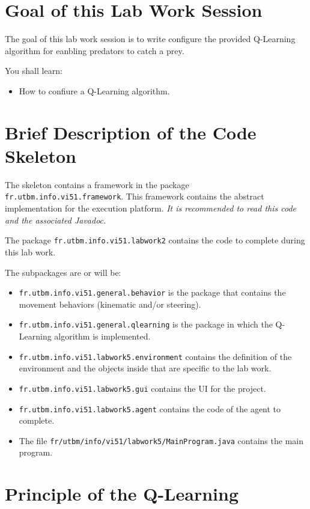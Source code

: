 \documentclass[article,english,nodocumentinfo]{multiagentfrreport}
\begin{document}
\section{Goal of this Lab Work Session}

The goal of this lab work session is to write configure the provided Q-Learning algorithm for eanbling predators to catch a prey.

You shall learn: 
\begin{itemize}
\item How to confiure a Q-Learning algorithm.
\end{itemize}



\section{Brief Description of the Code Skeleton}

The skeleton contains a framework in the package \texttt{fr.utbm.info.vi51.framework}.
This framework contains the abstract implementation for the execution platform.
\emph{It is recommended to read this code and the associated Javadoc.}

The package \texttt{fr.utbm.info.vi51.labwork2} contains the code to complete during this lab work.

The subpackages are or will be:
\begin{itemize}
\item \texttt{fr.utbm.info.vi51.general.behavior} is the package that contains the movement behaviors (kinematic and/or steering).
\item \texttt{fr.utbm.info.vi51.general.qlearning} is the package in which the Q-Learning algorithm is implemented.
\item \texttt{fr.utbm.info.vi51.labwork5.environment} contains the definition of the environment and the objects inside that are specific to the lab work.
\item \texttt{fr.utbm.info.vi51.labwork5.gui} contains the UI for the project.
\item \texttt{fr.utbm.info.vi51.labwork5.agent} contains the code of the agent to complete.
\item The file \texttt{fr/utbm/info/vi51/labwork5/MainProgram.java} contains the main program.
\end{itemize}

\section{Principle of the Q-Learning}
\end{document}
